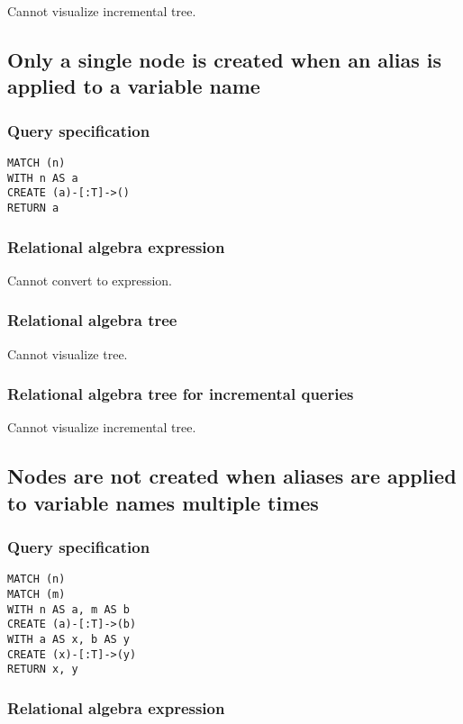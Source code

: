 Cannot visualize incremental tree.

\subsection{Only a single node is created when an alias is applied to a variable name}

\subsubsection*{Query specification}

\begin{lstlisting}
MATCH (n)
WITH n AS a
CREATE (a)-[:T]->()
RETURN a
\end{lstlisting}

\subsubsection*{Relational algebra expression}

Cannot convert to expression.

\subsubsection*{Relational algebra tree}

Cannot visualize tree.

\subsubsection*{Relational algebra tree for incremental queries}

Cannot visualize incremental tree.

\subsection{Nodes are not created when aliases are applied to variable names multiple times}

\subsubsection*{Query specification}

\begin{lstlisting}
MATCH (n)
MATCH (m)
WITH n AS a, m AS b
CREATE (a)-[:T]->(b)
WITH a AS x, b AS y
CREATE (x)-[:T]->(y)
RETURN x, y
\end{lstlisting}

\subsubsection*{Relational algebra expression}

